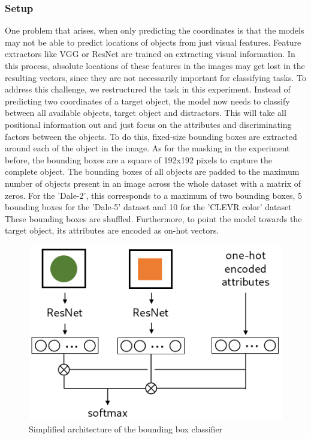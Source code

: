 \subsubsection*{Setup}
One problem that arises, when only predicting the coordinates is that the models may not be able to predict locations of objects from just visual features.
Feature extractors like VGG or ResNet are trained on extracting visual information.
In this process, absolute locations of these features in the images may get lost in the resulting vectors, since they are not necessarily important for classifying tasks.
To address this challenge, we restructured the task in this experiment.
Instead of predicting two coordinates of a target object, the model now needs to classify between all available objects, target object and distractors.
This will take all positional information out and just focus on the attributes and discriminating factors between the objects.
To do this, fixed-size bounding boxes are extracted around each of the object in the image.
As for the masking in the experiment before, the bounding boxes are a square of 192x192 pixels to capture the complete object.
The bounding boxes of all objects are padded to the maximum number of objects present in an image across the whole dataset with a matrix of zeros.
For the 'Dale-2', this corresponds to a maximum of two bounding boxes, 5 bounding boxes for the 'Dale-5' dataset and 10 for the 'CLEVR color' dataset
These bounding boxes are shuffled.
Furthermore, to point the model towards the target object, its attributes are encoded as on-hot vectors.

\begin{figure}[ht]
    \centering
    \includegraphics[width=.5\linewidth]{figures/arch_bounding_box_classifier.png}
    \caption{Simplified architecture of the bounding box classifier}
    \label{fig:bounding_box_classifier_architecture}
\end{figure}

